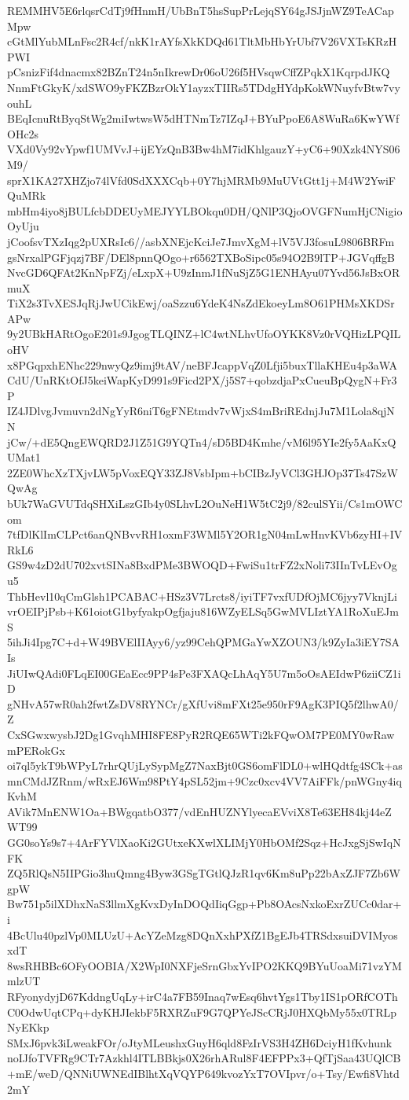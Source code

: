 REMMHV5E6rlqsrCdTj9fHnmH/UbBnT5hsSupPrLejqSY64gJSJjnWZ9TeACapMpw
cGtMlYubMLnFsc2R4cf/nkK1rAYfsXkKDQd61TltMbHbYrUbf7V26VXTsKRzHPWI
pCsnizFif4dnacmx82BZnT24n5nIkrewDr06oU26f5HVsqwCffZPqkX1KqrpdJKQ
NnmFtGkyK/xdSWO9yFKZBzrOkY1ayzxTIIRs5TDdgHYdpKokWNuyfvBtw7vyouhL
BEqIcnuRtByqStWg2miIwtwsW5dHTNmTz7IZqJ+BYuPpoE6A8WuRa6KwYWfOHc2s
VXd0Vy92vYpwf1UMVvJ+ijEYzQnB3Bw4hM7idKhlgauzY+yC6+90Xzk4NYS06M9/
sprX1KA27XHZjo74lVfd0SdXXXCqb+0Y7hjMRMb9MuUVtGtt1j+M4W2YwiFQuMRk
mbHm4iyo8jBULfcbDDEUyMEJYYLBOkqu0DH/QNlP3QjoOVGFNumHjCNigioOyUju
jCoofsvTXzIqg2pUXRsIc6//asbXNEjcKciJe7JmvXgM+lV5VJ3fosuL9806BRFm
gsNrxalPGFjqzj7BF/DEl8pnnQOgo+r6562TXBoSipc05s94O2B9lTP+JGVqffgB
NvcGD6QFAt2KnNpFZj/eLxpX+U9zInmJ1fNuSjZ5G1ENHAyu07Yvd56JsBxORmuX
TiX2s3TvXESJqRjJwUCikEwj/oaSzzu6YdeK4NsZdEkoeyLm8O61PHMsXKDSrAPw
9y2UBkHARtOgoE201s9JgogTLQINZ+lC4wtNLhvUfoOYKK8Vz0rVQHizLPQILoHV
x8PGqpxhENhc229nwyQz9imj9tAV/neBFJcappVqZ0Lfji5buxTllaKHEu4p3aWA
CdU/UnRKtOfJ5keiWapKyD991s9Ficd2PX/j5S7+qobzdjaPxCueuBpQygN+Fr3P
IZ4JDlvgJvmuvn2dNgYyR6niT6gFNEtmdv7vWjxS4mBriREdnjJu7M1Lola8qjNN
jCw/+dE5QngEWQRD2J1Z51G9YQTn4/sD5BD4Kmhe/vM6l95YIe2fy5AaKxQUMat1
2ZE0WhcXzTXjvLW5pVoxEQY33ZJ8VsbIpm+bCIBzJyVCl3GHJOp37Ts47SzWQwAg
bUk7WaGVUTdqSHXiLszGIb4y0SLhvL2OuNeH1W5tC2j9/82culSYii/Cs1mOWCom
7tfDlKlImCLPct6anQNBvvRH1oxmF3WMl5Y2OR1gN04mLwHnvKVb6zyHI+IVRkL6
GS9w4zD2dU702xvtSINa8BxdPMe3BWOQD+FwiSu1trFZ2xNoli73IInTvLEvOgu5
ThbHevl10qCmGlsh1PCABAC+HSz3V7Lrcts8/iyiTF7vxfUDfOjMC6jyy7VknjLi
vrOEIPjPsb+K61oiotG1byfyakpOgfjaju816WZyELSq5GwMVLIztYA1RoXuEJmS
5ihJi4Ipg7C+d+W49BVElIIAyy6/yz99CehQPMGaYwXZOUN3/k9ZyIa3iEY7SAIs
JiUIwQAdi0FLqEI00GEaEcc9PP4sPe3FXAQcLhAqY5U7m5oOsAEIdwP6ziiCZ1iD
gNHvA57wR0ah2fwtZsDV8RYNCr/gXfUvi8mFXt25e950rF9AgK3PIQ5f2lhwA0/Z
CxSGwxwysbJ2Dg1GvqhMHI8FE8PyR2RQE65WTi2kFQwOM7PE0MY0wRawmPERokGx
oi7ql5ykT9bWPyL7rhrQUjLySypMgZ7NaxBjt0GS6omFlDL0+wlHQdtfg4SCk+as
mnCMdJZRnm/wRxEJ6Wm98PtY4pSL52jm+9Czc0xcv4VV7AiFFk/pnWGny4iqKvhM
AVik7MnENW1Oa+BWgqatbO377/vdEnHUZNYlyecaEVviX8Te63EH84kj44eZWT99
GG0soYs9s7+4ArFYVlXaoKi2GUtxeKXwlXLIMjY0HbOMf2Sqz+HcJxgSjSwIqNFK
ZQ5RlQsN5IIPGio3huQmng4Byw3GSgTGtlQJzR1qv6Km8uPp22bAxZJF7Zb6WgpW
Bw751p5ilXDhxNaS3llmXgKvxDyInDOQdIiqGgp+Pb8OAcsNxkoExrZUCc0dar+i
4BcUlu40pzlVp0MLUzU+AcYZeMzg8DQnXxhPXfZ1BgEJb4TRSdxsuiDVIMyosxdT
8wsRHBBc6OFyOOBIA/X2WpI0NXFjeSrnGbxYvIPO2KKQ9BYuUoaMi71vzYMmlzUT
RFyonydyjD67KddngUqLy+irC4a7FB59Inaq7wEsq6hvtYgs1Tby1IS1pORfCOTh
C0OdwUqtCPq+dyKHJIekbF5RXRZuF9G7QPYeJScCRjJ0HXQbMy55x0TRLpNyEKkp
SMxJ6pvk3iLweakFOr/oJtyMLeushxGuyH6qld8FzIrVS3H4ZH6DciyH1fKvhunk
noIJfoTVFRg9CTr7Azkhl4ITLBBkjs0X26rhARul8F4EFPPx3+QfTjSaa43UQlCB
+mE/weD/QNNiUWNEdIBlhtXqVQYP649kvozYxT7OVIpvr/o+Tsy/Ewfi8Vhtd2mY
